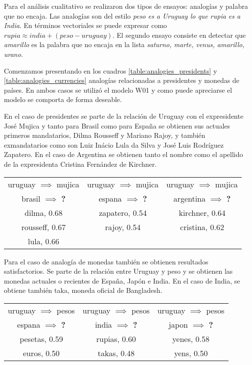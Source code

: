 Para el análisis cualitativo se realizaron dos tipos de ensayos: analogías y palabra que no encaja. Las
analogías son del estilo \textit{peso es a Uruguay lo que rupia es a India}. En términos vectoriales
se puede expresar como $rupia \approx india + (peso - uruguay)$. El segundo ensayo consiste en
detectar que \textit{amarillo} es la palabra que no encaja en la lista \textit{saturno, marte, venus,
amarillo, urano}.

Comenzamos presentando en los cuadros \ref{table:analogies_presidents} y
\ref{table:analogies_currencies} analogías relacionadas a presidentes y monedas de países. En ambos
casos se utilizó el modelo W01 y como puede apreciarse el modelo se comporta de forma deseable.

En el caso de presidentes se parte de la relación de Uruguay con el expresidente José Mujica y tanto
para Brasil como para España se obtienen sus actuales primeros mandatarios, Dilma Rousseff y
Mariano Rajoy, y también exmandatarios como son Luiz Inácio Lula da Silva y José Luis Rodríguez
Zapatero. En el caso de Argentina se obtienen tanto el nombre como el apellido de la expresidenta
Cristina Fernández de Kirchner.

\begin{table*}[ht]
    \centering
    \begin{tabular}{|c|c|c|}
        \hline
        uruguay $\implies$ mujica & uruguay $\implies$ mujica & uruguay $\implies$ mujica\\
        brasil $\implies$ \textbf{?} & espana $\implies$ \textbf{?} & argentina $\implies$ \textbf{?}\\
        \hline
        dilma, 0.68 & zapatero, 0.54 & kirchner, 0.64\\
        rousseff, 0.67 & rajoy, 0.54 & cristina, 0.62\\
        lula, 0.66 & & \\
        \hline
    \end{tabular}
    \caption{Analogías para países y presidentes.}
    \label{table:analogies_presidents}
\end{table*}

Para el caso de analogía de monedas también se obtienen resultados satisfactorios. Se parte de
la relación entre Uruguay y peso y se obtienen las monedas actuales o recientes de España, Japón
e India. En el caso de India, se obtiene también taka, moneda oficial de Bangladesh.

\begin{table*}[ht]
    \centering
    \begin{tabular}{|c|c|c|}
        \hline
        uruguay $\implies$ pesos & uruguay $\implies$ pesos & uruguay $\implies$ pesos\\
        espana $\implies$ \textbf{?} & india $\implies$ \textbf{?} & japon $\implies$ \textbf{?}\\
        \hline
        pesetas, 0.59 & rupias, 0.60 & yenes, 0.58\\
        euros, 0.50 & takas, 0.48 & yens, 0.50\\
        \hline
    \end{tabular}
    \caption{Analogías para países y monedas.}
    \label{table:analogies_currencies}
\end{table*}

